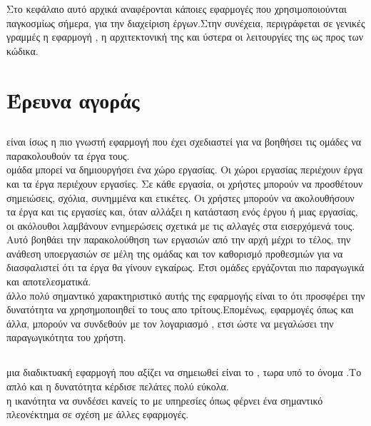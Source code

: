 Στο κεφάλαιο αυτό αρχικά αναφέρονται κάποιες εφαρμογές που χρησιμοποιούνται παγκοσμίως σήμερα, για την διαχείριση έργων.Στην συνέχεια, περιγράφεται σε γενικές γραμμές η εφαρμογή , η αρχιτεκτονική της και ύστερα οι λειτουργίες της ως προς των κώδικα.

\section{Έρευνα αγοράς}

\subsection{}
  είναι ίσως η πιο γνωστή εφαρμογή που έχει σχεδιαστεί για να βοηθήσει τις ομάδες να παρακολουθούν τα έργα τους.\\
 ομάδα μπορεί να δημιουργήσει ένα χώρο εργασίας. Οι χώροι εργασίας περιέχουν έργα και τα έργα περιέχουν εργασίες. Σε κάθε εργασία, οι χρήστες μπορούν να προσθέτουν σημειώσεις, σχόλια, συνημμένα και ετικέτες. Οι χρήστες μπορούν να ακολουθήσουν τα έργα και τις εργασίες και, όταν αλλάξει η κατάσταση ενός έργου ή μιας εργασίας, οι ακόλουθοι λαμβάνουν ενημερώσεις σχετικά με τις αλλαγές στα εισερχόμενά τους.  Αυτό βοηθάει την παρακολούθηση των εργασιών από την αρχή μέχρι το τέλος, την ανάθεση υποεργασιών σε μέλη της ομάδας και τον καθορισμό προθεσμιών για να διασφαλιστεί ότι τα έργα θα γίνουν εγκαίρως. Έτσι ομάδες εργάζονται πιο παραγωγικά και αποτελεσματικά.\\
 άλλο πολύ σημαντικό χαρακτηριστικό αυτής της εφαρμογής είναι το ότι προσφέρει την δυνατότητα να χρησημοποιηθεί το  τους απο τρίτους.Επομένως, εφαρμογές όπως  και άλλα, μπορούν να συνδεθούν με τον λογαριασμό , ετσι ώστε να μεγαλώσει την παραγωγικότητα του χρήστη.

\subsection{}
 μια διαδικτυακή εφαρμογή που αξίζει να σημειωθεί είναι το , τωρα υπό το όνομα .Το απλό  και η δυνατότητα  κέρδισε πελάτες πολύ εύκολα.\\
 η ικανότητα να συνδέσει κανείς το  με υπηρεσίες όπως  φέρνει ένα σημαντικό πλεονέκτημα σε σχέση με άλλες εφαρμογές. 

